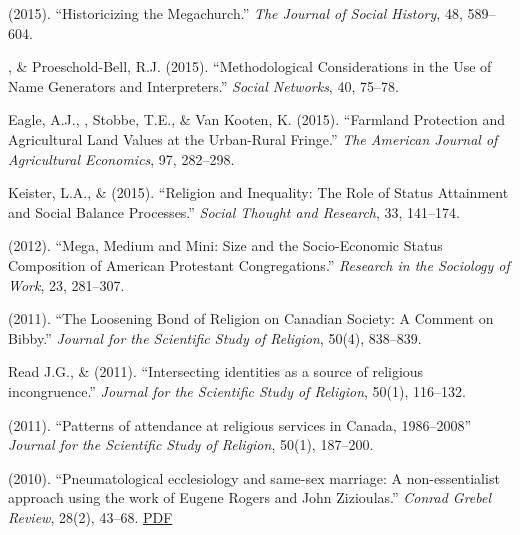 \begin{etaremune}
\item \Eagle \hspace{.01em} (2015). ``Historicizing the Megachurch.'' \textit{The Journal of Social History}, 48, 589--604. 

\item \Eagle, \& Proeschold-Bell, R.J. (2015). ``Methodological Considerations in the Use of Name Generators and Interpreters.'' \emph{Social Networks}, 40, 75--78. 

\item Eagle, A.J., \Eagle, Stobbe, T.E., \& Van Kooten, K. (2015). ``Farmland Protection and Agricultural Land Values at the Urban-Rural Fringe.'' \emph{The American Journal of Agricultural Economics}, 97, 282--298. 

\item Keister, L.A., \& \Eagle \hspace{.01em} (2015). ``Religion and Inequality: The Role of Status Attainment and Social Balance Processes.'' \emph{Social Thought and Research}, 33, 141--174.

\item \Eagle \hspace{.01em} (2012). ``Mega, Medium and Mini: Size and the Socio-Economic Status Composition of American Protestant Congregations.'' \emph{Research in the Sociology of Work}, 23, 281--307. 

\item \Eagle \hspace{.01em} (2011). ``The Loosening Bond of Religion on Canadian Society: A Comment on Bibby.'' \emph{Journal for the Scientific Study of Religion}, 50(4), 838--839.

\item Read J.G., \& \Eagle \hspace{.01em} (2011). ``Intersecting identities as a source of religious incongruence.''  \emph{Journal for the Scientific Study of Religion}, 50(1), 116--132. 

\item \Eagle \hspace{.01em} (2011). ``Patterns of attendance at religious services in Canada, 1986--2008'' \emph{Journal for the Scientific Study of Religion}, 50(1), 187--200. 

\item \Eagle \hspace{.01em} (2010). ``Pneumatological ecclesiology and same-sex marriage: A non-essentialist approach using the work of Eugene Rogers and John Zizioulas.'' \emph{Conrad Grebel Review}, 28(2), 43--68. \href{https://www.davideagle.org/publication/eagle-pneumatological-ecclesiology-samesex-2010/eagle-pneumatological-ecclesiology-samesex-2010.pdf}{PDF}


\end{etaremune}
